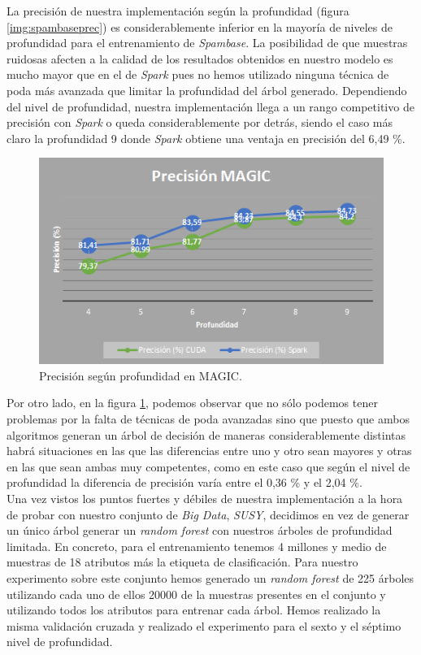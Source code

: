 La precisión de nuestra implementación según la profundidad (figura \ref{img:spambaseprec}) es considerablemente inferior en la mayoría de niveles de profundidad para el entrenamiento de \textit{Spambase}. La posibilidad de que muestras ruidosas afecten a la calidad de los resultados obtenidos en nuestro modelo es mucho mayor que en el de \textit{Spark} pues no hemos utilizado ninguna técnica de poda más avanzada que limitar la profundidad del árbol generado. Dependiendo del nivel de profundidad, nuestra implementación llega a un rango competitivo de precisión con \textit{Spark} o queda considerablemente por detrás, siendo el caso más claro la profundidad 9 donde \textit{Spark} obtiene una ventaja en precisión del 6,49 \%.\\

\begin{figure}[ht]
\centering
\includegraphics[scale=1.0]{imagenes/magic_prec.png}
\caption{Precisión según profundidad en MAGIC.}
\label{img:magicprec}
\end{figure}

Por otro lado, en la figura \ref{img:magicprec}, podemos observar que no sólo podemos tener problemas por la falta de técnicas de poda avanzadas sino que puesto que ambos algoritmos generan un árbol de decisión de maneras considerablemente distintas habrá situaciones en las que las diferencias entre uno y otro sean mayores y otras en las que sean ambas muy competentes, como en este caso que según el nivel de profundidad la diferencia de precisión varía entre el 0,36 \% y el 2,04 \%.\\

Una vez vistos los puntos fuertes y débiles de nuestra implementación a la hora de probar con nuestro conjunto de \textit{Big Data}, \textit{SUSY}, decidimos en vez de generar un único árbol generar un \textit{random forest} con nuestros árboles de profundidad limitada. En concreto, para el entrenamiento tenemos 4 millones y medio de muestras de 18 atributos más la etiqueta de clasificación. Para nuestro experimento sobre este conjunto hemos generado un \textit{random forest} de 225 árboles utilizando cada uno de ellos 20000 de la muestras presentes en el conjunto y utilizando todos los atributos para entrenar cada árbol. Hemos realizado la misma validación cruzada y realizado el experimento para el sexto y el séptimo nivel de profundidad.

